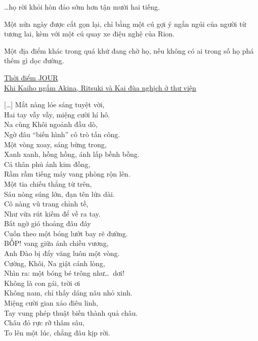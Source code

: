 \documentclass[../main.tex]{subfiles}
\begin{document}
\dots họ rời khỏi hòn đảo sớm hơn tận mười hai tiếng.

Một nửa ngày được cắt gọn lại, chỉ bằng một cú gợi ý ngắn ngủi của người từ tương lai, kèm với một cú quay xe điệu nghệ của Rion.

Một địa điểm khác trong quá khứ đang chờ họ, nếu không có ai trong số họ phá thêm gì dọc đường.

\begin{center}
  \uline{Thời điểm {\flaregothic JOUR }\\ Khi Kaiho ngắm Akina, Ritsuki và Kai đùa nghịch ở thư viện}
\end{center}

\begin{center}
  [\dots] Mắt nàng lóe sáng tuyệt vời,\\
  Hai tay vẫy vẫy, miệng cười hí hô.\\
  Na cùng Khôi ngoảnh đầu dò,\\
  Ngờ đâu ``biến hình'' cô trò tấn công.\\
  Một vòng xoay, sáng bừng trong,\\
  Xanh xanh, hồng hồng, ánh lấp bềnh bồng.\\
  Cả thân phủ ánh kim đồng,\\
  Rầm rầm tiếng máy vang phòng rộn lên.\\
  Một tia chiếu thẳng từ trên,\\
  Sáu nòng súng lớn, đạn tên lửa dài.\\
  Cô nàng vũ trang chỉnh tề,\\
  Như vừa rút kiếm để về ra tay.\\
  Bất ngờ gió thoảng đâu đây\\
  Cuốn theo một bóng lướt bay rẽ đường.\\
  BỐP! vang giữa ánh chiều vương,\\
  Anh Đào bị đẩy văng luôn một vòng.\\
  Cường, Khôi, Na giật cánh lòng,\\
  Nhìn ra: một bóng bé trông như\dots\ dơi!\\
  Không là con gái, trời ơi\\
  Không nam, chỉ thấy dáng nâu nhỏ xinh.\\
  Miệng cười gian xảo điêu linh,\\
  Tay vung phép thuật biến thành quả châu.\\
  Châu đỏ rực rỡ thâm sâu,\\
  To lên một lúc, chẳng đâu kịp rời.\\


\end{center}
\end{document}

